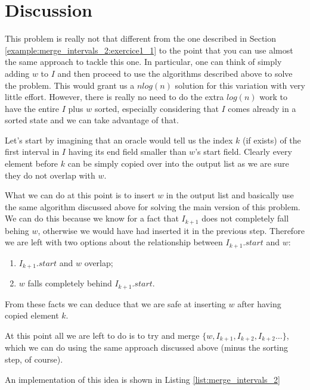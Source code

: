 \FloatBarrier

\section{Discussion}
\label{merge_intervals_2:sec:discussion_1}
This problem is really not that different from the one described in Section \ref{example:merge_intervals_2:exercice1_1} to the point that you can use almost the same approach to tackle this one. In particular, one can think of simply adding $w$ to $I$ and then proceed to use the algorithms described above to solve the problem. This would grant us a $nlog(n)$ solution for this variation with very little effort. 
However, there is really no need to do the extra $log(n)$ work to have the entire $I$ plus $w$ sorted, especially considering that $I$ comes already in a sorted state and we can take advantage of that. 

Let's start by imagining that an oracle would tell us the index $k$ (if exists) of the first interval in $I$ having its end field smaller than $w$'s start field.
Clearly every element before $k$ can be simply copied over into the output list as we are sure they do not overlap with $w$.

What we can do at this point is to insert $w$ in the output list and basically use the same algorithm discussed above for solving the main version of this problem. 
We can do this because we know for a fact that $I_{k+1}$ does not completely fall behing $w$, otherwise we would have had inserted it in the previous step.
Therefore we are left with two options about the relationship between $I_{k+1}.start$ and $w$:
\begin{enumerate}
	\item $I_{k+1}.start$ and $w$ overlap;
	\item $w$ falls completely behind $I_{k+1}.start$.
\end{enumerate}
From these facts we can deduce that we are safe at inserting $w$ after having copied element $k$.

At this point all we are left to do is to try and merge $\{w, I_{k+1},I_{k+2},I_{k+2}\ldots \}$, which we can do  using the same approach discussed above (minus the sorting step, of course).

An implementation of this idea is shown in Listing \ref{list:merge_intervals_2}



